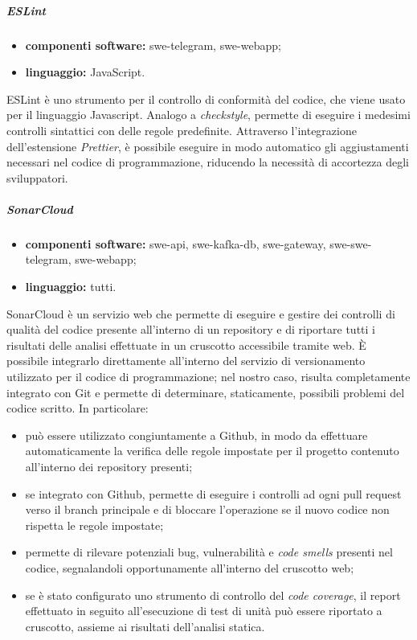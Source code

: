 				\subparagraph{ESLint} 
				
				\begin{itemize}
					\item \textbf{componenti software:} swe-telegram, swe-webapp;
					\item \textbf{linguaggio:} JavaScript.
				\end{itemize}
				
				ESLint è uno strumento per il controllo di conformità del codice, che viene usato per il linguaggio Javascript. Analogo a \textit{checkstyle}, permette di eseguire i medesimi controlli sintattici con delle regole predefinite. Attraverso l'integrazione dell'estensione \textit{Prettier}, è possibile eseguire in modo automatico gli aggiustamenti necessari nel codice di programmazione, riducendo la necessità di accortezza degli sviluppatori.
				
				\subparagraph{SonarCloud}
				
				\begin{itemize}
					\item \textbf{componenti software:} swe-api, swe-kafka-db, swe-gateway, swe-swe-telegram, swe-webapp;
					\item \textbf{linguaggio:} tutti.
				\end{itemize}
				
				SonarCloud è un servizio web che permette di eseguire e gestire dei controlli di qualità del codice presente all'interno di un repository e di riportare tutti i risultati delle analisi effettuate in un cruscotto accessibile tramite web. È possibile integrarlo direttamente all'interno del servizio di versionamento utilizzato per il codice di programmazione; nel nostro caso, risulta completamente integrato con Git e permette di determinare, staticamente, possibili problemi del codice scritto. In particolare:
				\begin{itemize}
					\item può essere utilizzato congiuntamente a Github, in modo da effettuare automaticamente la verifica delle regole impostate per il progetto contenuto all'interno dei repository presenti;
					\item se integrato con Github, permette di eseguire i controlli ad ogni pull request verso il branch principale e di bloccare l'operazione se il nuovo codice non rispetta le regole impostate; 
					\item permette di rilevare potenziali bug, vulnerabilità e \textit{code smells} presenti nel codice, segnalandoli opportunamente all'interno del cruscotto web;
					\item se è stato configurato uno strumento di controllo del \textit{code coverage}, il report effettuato in seguito all'esecuzione di test di unità può essere riportato a cruscotto, assieme ai risultati dell'analisi statica.
				\end{itemize}

